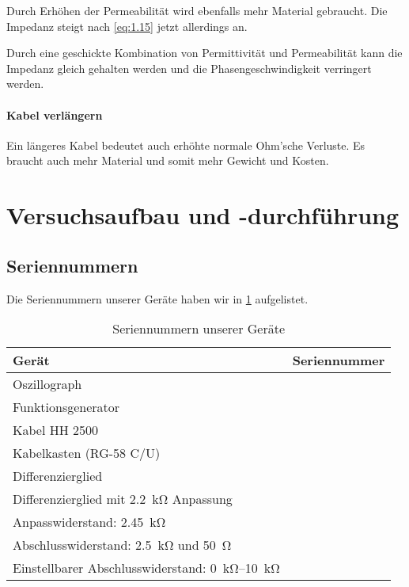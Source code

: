 Durch Erhöhen der Permeabilität wird ebenfalls mehr Material gebraucht. Die
Impedanz steigt nach \eqref{eq:1.15} jetzt allerdings an.

Durch eine geschickte Kombination von Permittivität und Permeabilität kann die
Impedanz gleich gehalten werden und die Phasengeschwindigkeit verringert
werden.

\paragraph{Kabel verlängern}

Ein längeres Kabel bedeutet auch erhöhte normale Ohm'sche Verluste. Es braucht
auch mehr Material und somit mehr Gewicht und Kosten.


\section{Versuchsaufbau und -durchführung}

\subsection{Seriennummern}

Die Seriennummern unserer Geräte haben wir in \cref{tb:seriennummern} aufgelistet.

\begin{table}
	\center
	\caption{Seriennummern unserer Geräte}
	\label{tb:seriennummern}
	\begin{tabular}{ll}
		Gerät & Seriennummer \\
		\hline
		Oszillograph & \\
		Funktionsgenerator & \\
		Kabel HH 2500 & \\
		Kabelkasten (RG-58 C/U) & \\
		Differenzierglied & \\
		Differenzierglied mit \SI{2.2}{\kilo\ohm} Anpassung & \\
		Anpasswiderstand: \SI{2.45}{\kilo\ohm} & \\
		Abschlusswiderstand: \SI{2.5}{\kilo\ohm} und \SI{50}{\ohm} & \\
		Einstellbarer Abschlusswiderstand: \SIrange{0}{10}{\kilo\ohm} &
	\end{tabular}
\end{table}

